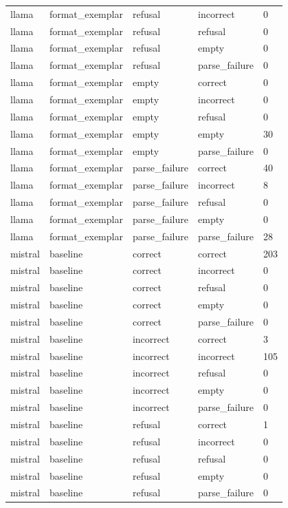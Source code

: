 \begin{tabular}{lllll}
llama & format\_exemplar & refusal & incorrect & 0 \\
llama & format\_exemplar & refusal & refusal & 0 \\
llama & format\_exemplar & refusal & empty & 0 \\
llama & format\_exemplar & refusal & parse\_failure & 0 \\
llama & format\_exemplar & empty & correct & 0 \\
llama & format\_exemplar & empty & incorrect & 0 \\
llama & format\_exemplar & empty & refusal & 0 \\
llama & format\_exemplar & empty & empty & 30 \\
llama & format\_exemplar & empty & parse\_failure & 0 \\
llama & format\_exemplar & parse\_failure & correct & 40 \\
llama & format\_exemplar & parse\_failure & incorrect & 8 \\
llama & format\_exemplar & parse\_failure & refusal & 0 \\
llama & format\_exemplar & parse\_failure & empty & 0 \\
llama & format\_exemplar & parse\_failure & parse\_failure & 28 \\
mistral & baseline & correct & correct & 203 \\
mistral & baseline & correct & incorrect & 0 \\
mistral & baseline & correct & refusal & 0 \\
mistral & baseline & correct & empty & 0 \\
mistral & baseline & correct & parse\_failure & 0 \\
mistral & baseline & incorrect & correct & 3 \\
mistral & baseline & incorrect & incorrect & 105 \\
mistral & baseline & incorrect & refusal & 0 \\
mistral & baseline & incorrect & empty & 0 \\
mistral & baseline & incorrect & parse\_failure & 0 \\
mistral & baseline & refusal & correct & 1 \\
mistral & baseline & refusal & incorrect & 0 \\
mistral & baseline & refusal & refusal & 0 \\
mistral & baseline & refusal & empty & 0 \\
mistral & baseline & refusal & parse\_failure & 0 \\

\end{tabular}
